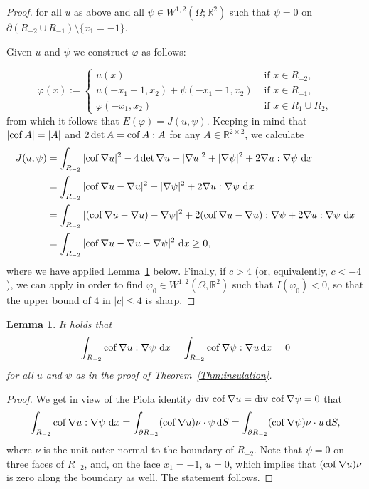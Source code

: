 \documentclass[12pt]{amsart}
\newcommand{\md}{{\rm d}}
\newcommand{\dx}{\, \md x}
\newcommand{\R}{\mathbb{R}}
\newcommand{\om}{\Omega}
\newcommand{\cof}{{\rm cof}\,}
\newcommand{\1}{{\bf 1}}
\newtheorem{lemma}[definition]{Lemma}
\begin{document}
\begin{proof}
for all $u$ as above and all $\psi\in W^{1,2}(\om;\R^2)$ such that  $\psi=0$ on  $\partial(R_{-2}\cup R_{-1})\setminus\{x_1=-1\}$.

Given $u$ and $\psi $ we construct $\varphi$ as follows:

$$
\varphi(x):=
\begin{cases}
    u(x)  & \text{ if } x\in R_{-2},\\
 u(-x_1-1,x_2)+\psi(-x_1-1,x_2)    & \text{ if } x\in R_{-1},\\
 \varphi(-x_1,x_2) & \text{ if } x\in R_{1}\cup R_2,\end{cases}
$$
from which it follows that $E(\varphi)= J(u,\psi)$.  Keeping in mind that $|\cof A|=|A|$  and $2\det A=\cof A:A$ for any $A\in\R^{2\times 2}$,
we calculate
\begin{align*}
J(u,\psi)&= \int_{R_{-2}} |\cof\nabla u|^2 -4 \det\nabla u +|\nabla u|^2+|\nabla\psi|^2 + 2\nabla u:\nabla\psi\,\dx\\
&=\int_{R_{-2}} |\cof\nabla u-\nabla u|^2 +|\nabla\psi|^2 + 2\nabla u:\nabla\psi\,\dx\\
&= \int_{R_{-2}}|(\cof\nabla u-\nabla u)-\nabla\psi|^2+2(\cof\nabla u-\nabla u):\nabla \psi+2\nabla u:\nabla\psi\,\dx\\
&=\int_{R_{-2}}|\cof\nabla u-\nabla u-\nabla\psi|^2\,\dx\ge 0,
\end{align*}
where we have applied Lemma~\ref{Jon'slemma} below.  Finally, if $c>4$ (or, equivalently, $c<-4$), we can apply \cite[Proposition 3.4]{BKV23} in order to find $\varphi_0 \in W^{1,2}(\om,\R^2)$ such that $I(\varphi_0)<0$, so that the upper bound of $4$ in $|c|\leq 4$ is sharp.
\end{proof}

\begin{lemma}\label{Jon'slemma}
 It holds that $$\int_{R_{-2}}\cof\nabla u:\nabla\psi\,\dx=\int_{R_{-2}}\cof\nabla\psi :\nabla u\dx =0$$   for all $u$ and $\psi$ as in the proof of Theorem~\ref{Thm:insulation}.
\end{lemma}

\begin{proof}
    We get in view of the Piola identity ${\rm div}\,\,\cof\nabla u= {\rm div}\,\,\cof\nabla \psi=0$ that 
    $$
    \int_{R_{-2}}\cof\nabla u:\nabla\psi\,\dx=\int_{\partial R_{-2}} (\cof\nabla u)\nu\cdot\psi\,{\rm d}S=\int_{\partial R_{-2}} (\cof\nabla \psi)\nu\cdot u\,{\rm d}S , $$
    where $\nu$ is the unit outer normal to the boundary of $R_{-2}$.
    Note that $\psi=0$ on three faces of $R_{-2}$, and, on the face $x_1=-1$,  $u=0$, which implies that $(\cof\nabla u)\nu$  is zero along the boundary as well. 
    The statement follows. 
    \end{proof}
\end{document}
